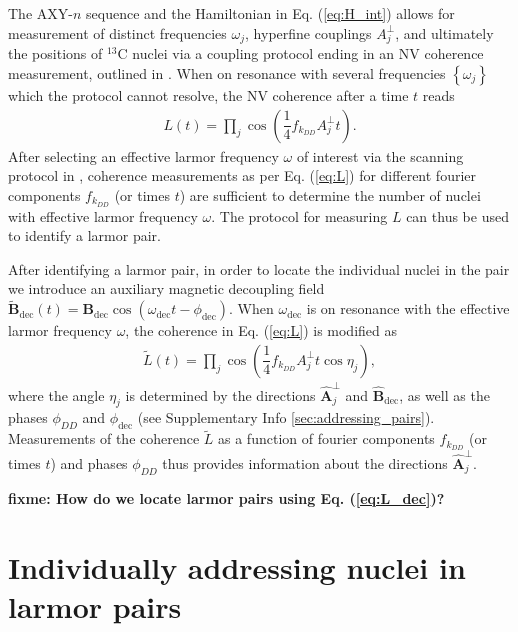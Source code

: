 \documentclass[twocolumn]{revtex4-1}
\renewcommand{\t}{\text} %
\newcommand{\f}[2]{\dfrac{#1}{#2}} %
\newcommand{\p}[1]{\left(#1\right)} %
\renewcommand{\set}[1]{\left\{#1\right\}} %
\renewcommand{\v}{\bm} %
\newcommand{\uv}[1]{\hat{\v{#1}}} %
\newcommand{\fixme}[1]{{\bf \color{red} fixme: #1}}
\begin{document}
The AXY-$n$ sequence and the Hamiltonian in Eq. (\ref{eq:H_int})
allows for measurement of distinct frequencies $\omega_j$, hyperfine
couplings $A_j^\perp$, and ultimately the positions of $^{13}$C nuclei
via a coupling protocol ending in an NV coherence measurement,
outlined in \cite{wang2016positioning}. When on resonance with several
frequencies $\set{\omega_j}$ which the protocol cannot resolve, the NV
coherence after a time $t$ reads
\begin{align}
  \label{eq:L}
  L\p{t} = \prod_j\cos\p{\f14 f_{k_{DD}}A_j^\perp t}.
\end{align}
After selecting an effective larmor frequency $\omega$ of interest via
the scanning protocol in \cite{wang2016positioning}, coherence
measurements as per Eq. (\ref{eq:L}) for different fourier components
$f_{k_{DD}}$ (or times $t$) are sufficient to determine the number of
nuclei with effective larmor frequency $\omega$. The protocol for
measuring $L$ can thus be used to identify a larmor pair.

After identifying a larmor pair, in order to locate the individual
nuclei in the pair we introduce an auxiliary magnetic decoupling field
$\tilde{\v B}_{\t{dec}}\p{t} = \v
B_{\t{dec}}\cos\p{\omega_{\t{dec}}t-\phi_{\t{dec}}}$. When
$\omega_{\t{dec}}$ is on resonance with the effective larmor frequency
$\omega$, the coherence in Eq. (\ref{eq:L}) is modified as
\begin{align}
  \label{eq:L_dec}
  \tilde L\p{t}
  = \prod_j\cos\p{\f14 f_{k_{DD}}A_j^\perp t\cos\eta_j},
\end{align}
where the angle $\eta_j$ is determined by the directions
$\uv A_j^\perp$ and $\uv B_{\t{dec}}$, as well as the phases
$\phi_{DD}$ and $\phi_{\t{dec}}$ (see Supplementary Info
\ref{sec:addressing_pairs}). Measurements of the coherence $\tilde L$
as a function of fourier components $f_{k_{DD}}$ (or times $t$) and
phases $\phi_{DD}$ thus provides information about the directions
$\uv A_j^\perp$.

\fixme{How do we locate larmor pairs using Eq. (\ref{eq:L_dec})?}

\section{Individually addressing nuclei in larmor pairs}
\end{document}
